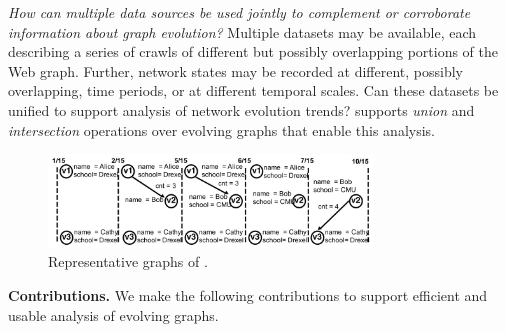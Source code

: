 {\em How can multiple data sources be used jointly to complement or
  corroborate information about graph evolution?}  Multiple datasets may be available, each describing a
series of crawls of different but possibly overlapping portions of
the Web graph.  Further, network states may be recorded at different,
possibly overlapping, time periods, or at different temporal scales.
Can these datasets be unified to support
analysis of network evolution trends?  \ql
supports {\em union} and {\em intersection} operations over evolving
graphs that enable this analysis.

\begin{figure}[t!]
\includegraphics[width=3.4in]{figs/T1_graphs.pdf}
\vspace{-0.5cm}
\caption{Representative graphs of \tg {}.}
\vspace{-0.4cm}
\label{fig:tg_rg}
\end{figure}

{\bf Contributions.} We make the following contributions to support
efficient and usable analysis of evolving graphs.


